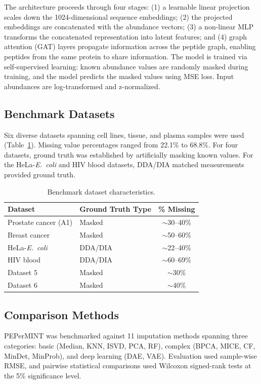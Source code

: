 \documentclass[12pt]{article}
\begin{document}
The architecture proceeds through four stages: (1) a learnable linear projection scales down the 1024-dimensional sequence embeddings; (2) the projected embeddings are concatenated with the abundance vectors; (3) a non-linear MLP transforms the concatenated representation into latent features; and (4) graph attention (GAT) layers \citep{velickovic2018graph} propagate information across the peptide graph, enabling peptides from the same protein to share information. The model is trained via self-supervised learning: known abundance values are randomly masked during training, and the model predicts the masked values using MSE loss. Input abundances are log-transformed and z-normalized.

\subsection{Benchmark Datasets}

Six diverse datasets spanning cell lines, tissue, and plasma samples were used (Table~\ref{tab:datasets}). Missing value percentages ranged from 22.1\% to 68.8\%. For four datasets, ground truth was established by artificially masking known values. For the HeLa-\textit{E.\ coli} and HIV blood datasets, DDA/DIA matched measurements provided ground truth.

\begin{table}[ht]
\centering
\caption{Benchmark dataset characteristics.}
\label{tab:datasets}
\begin{tabular}{llc}
\toprule
Dataset & Ground Truth Type & \% Missing \\
\midrule
Prostate cancer (A1) & Masked & $\sim$30--40\% \\
Breast cancer & Masked & $\sim$50--60\% \\
HeLa-\textit{E.\ coli} & DDA/DIA & $\sim$22--40\% \\
HIV blood & DDA/DIA & $\sim$60--69\% \\
Dataset 5 & Masked & $\sim$30\% \\
Dataset 6 & Masked & $\sim$40\% \\
\bottomrule
\end{tabular}
\end{table}

\subsection{Comparison Methods}

PEPerMINT was benchmarked against 11 imputation methods spanning three categories: basic (Median, KNN, ISVD, PCA, RF), complex (BPCA, MICE, CF, MinDet, MinProb), and deep learning (DAE, VAE). Evaluation used sample-wise RMSE, and pairwise statistical comparisons used Wilcoxon signed-rank tests at the 5\% significance level.
\end{document}
